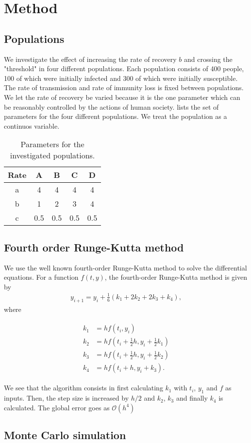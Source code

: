 \documentclass[../main.tex]{subfiles}
\begin{document}
\section{Method}\label{sec:method}
\subsection{Populations}
We investigate the effect of increasing the rate of recovery $b$ and crossing the "threshold" in four different populations. Each population consists of 400 people, 100 of which were initially infected and 300 of which were initially susceptible. The rate of transmission and rate of immunity loss is fixed between populations. We let the rate of recovery be varied because it is the one parameter which can be reasonably controlled by the actions of human society.  lists the set of parameters for the four different populations. We treat the population as a continuos variable. 
\begin{table}[htb]
    \centering
    \caption{Parameters for the investigated populations.}
    \begin{tabular}{c c c c c}
    \toprule
    Rate & A & B & C & D \\
    \midrule
    a & 4 & 4 & 4 & 4 \\
    b & 1 & 2 & 3 & 4 \\
    c & 0.5 & 0.5 & 0.5 & 0.5 \\
    \bottomrule
    \end{tabular}
    \label{tab:parameters}
\end{table}

\subsection{Fourth order Runge-Kutta method}
We use the well known fourth-order Runge-Kutta method to solve the differential equations. For a function \ensuremath{f(t, y)}, the fourth-order Runge-Kutta method is given by
\begin{align}
    y_{i+1}=y_i+\frac{1}{6}(k_1+2k_2+2k_3+k_4), 
    \label{eq:rk4}
\end{align} where

\begin{align}
    \begin{split}
        k_1&=hf(t_i, y_i) \\
        k_2&=hf(t_i+\frac{1}{2}h, y_i+\frac{1}{2}k_1) \\
        k_3&=hf(t_i+\frac{1}{2}h, y_i+\frac{1}{2}k_2)\\
        k_4&=hf(t_i+h, y_i+k_3).
    \end{split}
\end{align}

We see that the algorithm consists in first calculating $k_1$ with $t_i$, $y_1$ and $f$ as inputs. Then, the step size is increased by \ensuremath{h/2} and $k_2$, $k_3$ and finally $k_4$ is calculated. The global error goes as \ensuremath{\mathcal{O}(h^4)}
\subsection{Monte Carlo simulation}
\end{document}
